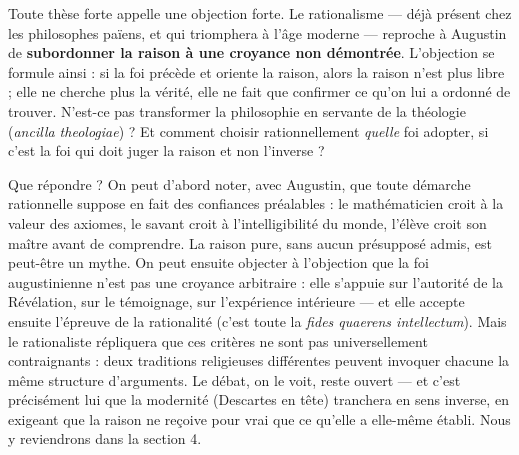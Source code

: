 \documentclass[11pt]{article}
\begin{document}
Toute thèse forte appelle une objection forte. Le rationalisme — déjà présent chez les philosophes païens, et qui triomphera à l'âge moderne — reproche à Augustin de \textbf{subordonner la raison à une croyance non démontrée}. L'objection se formule ainsi : si la foi précède et oriente la raison, alors la raison n'est plus libre ; elle ne cherche plus la vérité, elle ne fait que confirmer ce qu'on lui a ordonné de trouver. N'est-ce pas transformer la philosophie en servante de la théologie (\emph{ancilla theologiae}) ? Et comment choisir rationnellement \emph{quelle} foi adopter, si c'est la foi qui doit juger la raison et non l'inverse ?

Que répondre ? On peut d'abord noter, avec Augustin, que toute démarche rationnelle suppose en fait des confiances préalables : le mathématicien croit à la valeur des axiomes, le savant croit à l'intelligibilité du monde, l'élève croit son maître avant de comprendre. La raison pure, sans aucun présupposé admis, est peut-être un mythe. On peut ensuite objecter à l'objection que la foi augustinienne n'est pas une croyance arbitraire : elle s'appuie sur l'autorité de la Révélation, sur le témoignage, sur l'expérience intérieure — et elle accepte ensuite l'épreuve de la rationalité (c'est toute la \emph{fides quaerens intellectum}). Mais le rationaliste répliquera que ces critères ne sont pas universellement contraignants : deux traditions religieuses différentes peuvent invoquer chacune la même structure d'arguments. Le débat, on le voit, reste ouvert — et c'est précisément lui que la modernité (Descartes en tête) tranchera en sens inverse, en exigeant que la raison ne reçoive pour vrai que ce qu'elle a elle-même établi. Nous y reviendrons dans la section 4.
\end{document}
